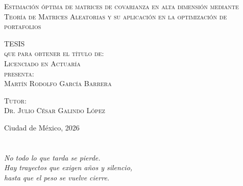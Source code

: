 \documentclass[letterpaper,12pt,oneside]{book}
\begin{document}
\begin{titlepage}
\begin{minipage}[c][0.81\textheight][t]{0.75\textwidth}
\begin{center}
                {\large\scshape Estimación óptima de matrices de covarianza en alta dimensión mediante Teoría de Matrices Aleatorias y su aplicación en la optimización de portafolios}\\[.2in]

                \vspace{2cm}            

                \textsc{\LARGE T\hspace{1.5cm}E\hspace{1.5cm}S\hspace{1.5cm}I\hspace{1.5cm}S}\\[0.5cm]
                \textsc{\large que para obtener el t\'itulo de:}\\[0.5cm]
                \textsc{\large Licenciado en Actuaría}\\[0.5cm]
                \textsc{\large presenta:}\\[0.5cm]
                \textsc{\large {Martín Rodolfo García Barrera}}\\[2cm]          

                \vspace{0.5cm}

                {\large\scshape Tutor:\\[0.3cm] {Dr. Julio César Galindo López}}\\[.2in]

                \vspace{0.5cm}

                \large{Ciudad de México,}{ }{2026}
            \end{center}
        \end{minipage}
    \end{titlepage}

\frontmatter
\chapter*{}
\begin{flushright}%
  \emph{No todo lo que tarda se pierde.\\  
        Hay trayectos que exigen años y  
        silencio,\\ hasta que el peso se vuelve cierre.}
  \thispagestyle{empty}
\end{flushright}
\end{document}

